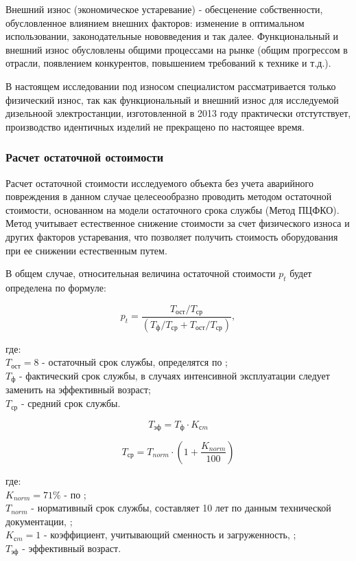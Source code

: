 Внешний износ (экономическое устаревание) - обесценение собственности, обусловленное влиянием внешних факторов: изменение в оптимальном использовании, законодательные нововведения и так далее.
Функциональный и внешний износ обусловлены общими процессами на рынке (общим прогрессом в отрасли, появлением конкурентов, повышением требований к технике и т.д.). 

В настоящем исследовании под  износом специалистом рассматривается только физический износ, так как функциональный и внешний износ для исследуемой дизельноой электростанции, изготовленной в 2013 году практически отстутствует, производство идентичных изделий не прекращено по настоящее время.



\subsubsection{Расчет остаточной остоимости}

Расчет остаточной стоимости исследуемого объекта без учета аварийного повреждения в данном случае целесеообразно проводить методом остаточной стоимости, основанном на модели остаточного срока службы (Метод ПЦФКО).
Метод учитывает естественное снижение стоимости за счет физического износа и других факторов устаревания, что позволяет получить стоимость оборудования при ее снижении естественным путем.

В общем случае, относительная величина остаточной стоимости $ p_t $ будет определена по формуле:

	\[ p_t =  \frac{T_{\text{ост}}/T_{\text{ср}}}{(T_{\text{ф}}/T_{\text{ср}} + T_{\text{ост}}/T_{\text{ср}})}, \]



\noindent где:\\
$ T_{\text{ост}} = 8$ - остаточный срок службы, определятся по \cite[по данным главы 5 ]{лейфер:2019};\\
$ T_{\text{ф}}$ - фактический  срок службы, в случаях интенсивной эксплуатации следует заменить на эффективный возраст;\\
$ T_{\text{ср}}$ - средний срок службы.

\[ T_{\text{эф}} = T_{\text{ф}} \cdot K_{сm}  \]

\[ T_{\text{ср}} = T_{norm}\cdot\left( 1 + \frac{K_{norm}}{100}\right)   \]
	
\noindent где:\\
\noindent$ K_{norm}  = 71\% $ - по \cite[табл.5.2.1.2 ]{лейфер:2019}; \\
$ T_{norm}$ - нормативный срок службы, составляет 10 лет по данным технической документации, \cite{ad:30};\\	
$ K_{сm} = 1 $ - коэффициент, учитывающий сменность и загруженность, \cite[табл. 4.1.1]{лейфер:2019};\\
$ T_{\text{эф}}$ - эффективный возраст.\\
	
